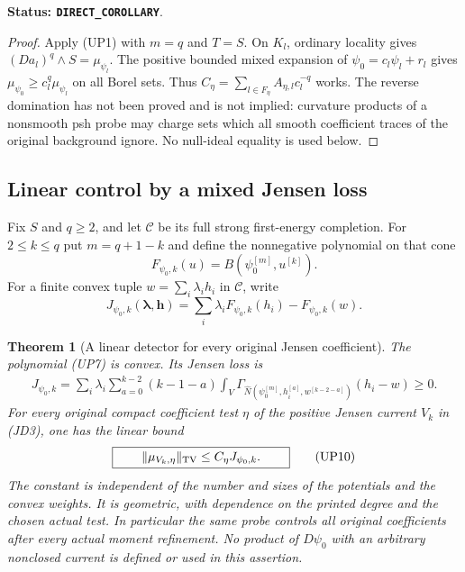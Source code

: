 \documentclass[11pt,a4paper]{article}
\numberwithin{equation}{section}
\newtheorem{theorem}{Theorem}[section]
\theoremstyle{definition}
\theoremstyle{remark}
\begin{document}
\noindent\textbf{Status: \texttt{DIRECT\_COROLLARY}}.

\begin{proof}
Apply (UP1) with $m=q$ and $T=S$.  On $K_l$, ordinary locality
gives $(Da_l)^q\wedge S=\mu_{\psi_l}$.  The positive bounded
mixed expansion of $\psi_0=c_l\psi_l+r_l$ gives
$\mu_{\psi_0}\geq c_l^q\mu_{\psi_l}$ on all Borel sets.
Thus $C_\eta=\sum_{l\in F_\eta}A_{\eta,l}c_l^{-q}$ works.
The reverse domination has not been proved and is not implied:
curvature products of a nonsmooth psh probe may charge sets
which all smooth coefficient traces of the original background
ignore.  No null-ideal equality is used below.
\end{proof}

\subsection{Linear control by a mixed Jensen loss}

Fix $S$ and $q\geq2$, and let $\mathcal C$ be its full strong
first-energy completion.  For $2\leq k\leq q$ put $m=q+1-k$ and
define the nonnegative polynomial on that cone
\[
             F_{\psi_0,k}(u)=B(\psi_0^{[m]},u^{[k]}).
 \tag{UP7}
\]
For a finite convex tuple $w=\sum_i\lambda_i h_i$ in $\mathcal C$,
write
\[
 J_{\psi_0,k}(\boldsymbol\lambda,\mathbf h)
       =\sum_i\lambda_iF_{\psi_0,k}(h_i)-F_{\psi_0,k}(w).
 \tag{UP8}
\]

\begin{theorem}[A linear detector for every original Jensen coefficient]
\label{thm:r12-universal-jensen-detector}
The polynomial (UP7) is convex.  Its Jensen loss is
\[
 \begin{split}
 J_{\psi_0,k}
  =\sum_i\lambda_i\sum_{a=0}^{k-2}(k-1-a)
       \int_V\Gamma_{\widehat N(\psi_0^{[m]},h_i^{[a]},
                                     w^{[k-2-a]})}(h_i-w)
       \geq0.
 \end{split}
 \tag{UP9}
\]
For every original compact coefficient test $\eta$ of the positive
Jensen current $V_k$ in (JD3), one has the linear bound
\[
 \boxed{\qquad
              \|\mu_{V_k,\eta}\|_{\rm TV}
                         \leq C_\eta J_{\psi_0,k}.
 \qquad}
 \tag{UP10}
\]
The constant is independent of the number and sizes of the potentials
and the convex weights.  It is geometric, with dependence on the
printed degree and the chosen actual test.  In particular the same
probe controls all original coefficients after every actual moment
refinement.  No product of $D\psi_0$ with an arbitrary nonclosed
current is defined or used in this assertion.
\end{theorem}
\end{document}
